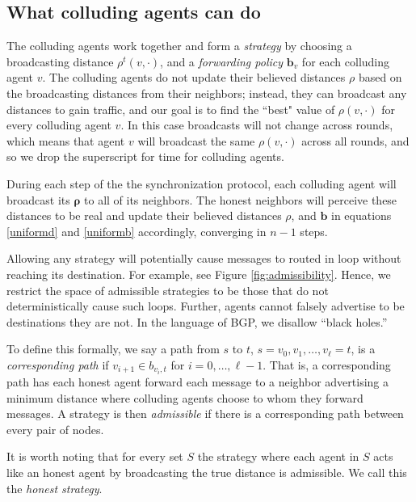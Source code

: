 \documentclass[reprint]{revtex4-1}
\begin{document}
\subsection{What colluding agents can do}
\label{sec:uniform-nonuniform-models}

The colluding agents work together and form a \emph{strategy} by choosing a broadcasting distance $\rho^t(v,\cdot)$,  and a {\it forwarding policy} $\mathbf{b}_{v}$ for each colluding agent $v$. The colluding agents do not update their believed distances $\rho$ based on the broadcasting distances from their neighbors; instead, they can broadcast any distances to gain traffic, and our goal is to find the ``best" value of $\rho(v,\cdot)$ for every colluding agent $v$. In this case broadcasts will not change across rounds, which means that agent $v$ will broadcast the same $\rho(v,\cdot)$  across all rounds, and so we drop the superscript for time for colluding agents.  

During each step of the the synchronization protocol, each colluding agent will broadcast its $\mathbf{\rho}$ to all of its neighbors. The honest neighbors will perceive these distances to be real and update their believed distances $\rho$, and $\mathbf{b}$ in equations \ref{uniformd} and \ref{uniformb} accordingly, converging in $n-1$ steps. 

Allowing any strategy will potentially cause messages to routed in loop without reaching its destination. For example, see Figure \ref{fig:admissibility}. Hence, we restrict the space of admissible strategies to be those that do not deterministically cause such loops. Further, agents cannot falsely advertise to be destinations they are not. In the language of BGP, we disallow ``black holes.'' 

To define this formally, we say a path from $s$ to $t$, $s= v_0, v_1, \ldots, v_{\ell} =  t$, is a {\it corresponding path} if $v_{i+1} \in b_{v_i,t}$ for $i=0, \ldots, \ell-1$. That is, a corresponding path has each honest agent forward each message to a neighbor advertising a minimum distance where colluding agents choose to whom they forward messages. A strategy is then \emph{admissible} if there is a corresponding path between every pair of nodes. 

It is worth noting that for every set $S$ the strategy where each agent in $S$ acts like an honest agent by broadcasting the true distance is admissible. We call this the {\it honest strategy}.
\end{document}
